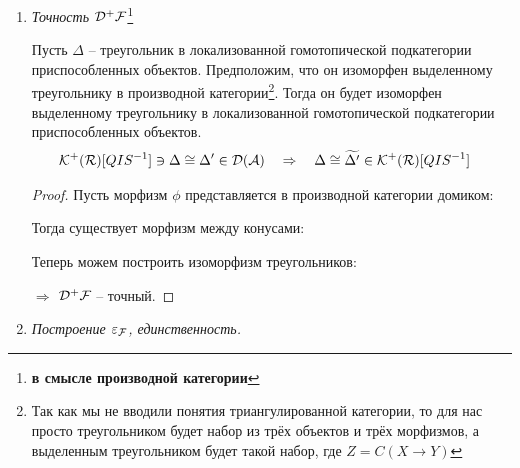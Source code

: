 \documentclass[../main.tex]{subfiles}
\begin{document}
\begin{enumerate}
     \item \textit{Точность $\mathcal{D^+ F}$}\footnote{\textbf{в смысле производной категории}}
\begin{to_lem}
Пусть $\Delta$ -- треугольник в локализованной гомотопической подкатегории приспособленных объектов. Предположим, что он изоморфен выделенному треугольнику в производной категории\footnote{Так как мы не вводили понятия триангулированной категории, то для нас просто треугольником будет набор из трёх объектов и трёх морфизмов, а выделенным треугольником будет такой набор, где $Z = C(X \to Y)$}. Тогда он будет изоморфен выделенному треугольнику в локализованной гомотопической подкатегории приспособленных объектов.
\begin{align*}
    \mathcal{K^+(\mathcal{R})}[QIS^{-1}] \ni \Delta &\cong \Delta' \in \mathcal{D(\mathcal{A})} \quad \Rightarrow \quad \Delta \cong \widetilde{\Delta'} \in \mathcal{K^+(R)}[QIS^{-1}]
\end{align*}
\end{to_lem}
\begin{proof}
    \bee
{}
    \eee
Пусть морфизм $\phi$ представляется  в производной категории домиком:
    \bee
{}
    \eee
    Тогда существует морфизм между конусами:
    \bee
    \eee
    Теперь можем построить изоморфизм треугольников:
    \bee
    \eee
    $\Rightarrow$ $\mathcal{D^+ F}$ -- точный.
\end{proof}
     \item \textit{Построение $\varepsilon_{\mathcal{F}}$, единственность.}

\end{enumerate}
\end{document}
